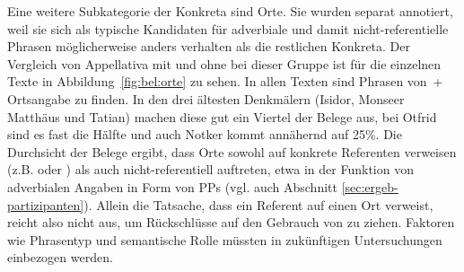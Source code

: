 Eine weitere Subkategorie der Konkreta  sind Orte. Sie wurden separat annotiert, weil sie sich als typische Kandidaten für adverbiale  und damit nicht-referentielle Phrasen möglicherweise anders verhalten als die restlichen  Konkreta. Der Vergleich von Appellativa  mit und ohne  bei dieser Gruppe ist für die einzelnen Texte in Abbildung~\ref{fig:bel:orte} zu sehen. In allen Texten sind Phrasen von \,+\,Ortsangabe zu finden. In den drei ältesten Denkmälern (Isidor, Monseer Matthäus und Tatian) machen diese gut ein Viertel der Belege aus, bei Otfrid sind es fast die Hälfte und auch Notker kommt annähernd auf 25\%. Die Durchsicht der Belege ergibt, dass Orte sowohl auf konkrete Referenten verweisen (z.B.  oder ) als auch nicht-referentiell auftreten, etwa in der Funktion von adverbialen  Angaben in Form von PPs (vgl. auch Abschnitt \ref{sec:ergeb-partizipanten}).
Allein die Tatsache, dass ein Referent auf einen Ort verweist, reicht also nicht aus, um Rückschlüsse auf den Gebrauch von  zu ziehen. Faktoren wie Phrasentyp und semantische Rolle  müssten in zukünftigen Untersuchungen einbezogen werden.  

